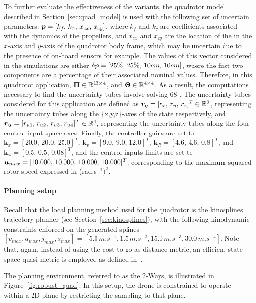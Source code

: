 To further evaluate the effectiveness of the  variants, the quadrotor model described in Section~\ref{sec:quad_model} is used with the following set of uncertain parameters: $\boldsymbol{p} = [k_{f}, \, k_{\tau}, \, x_{cx}, \, x_{cy}]$, where $k_{f}$ and $k_{\tau}$ are coefficients associated with the dynamics of the propellers, and $x_{cx}$ and $x_{cy}$ are the location of the  in the $x$-axis and $y$-axis of the quadrotor body frame, which may be uncertain due to the presence of on-board sensors for example.
The values of this vector considered in the simulations are either $\delta\boldsymbol{p} = [25\%, \, 25\%, \, 10cm, \, 10cm]$, where the first two components are a percentage of their associated nominal values. 
Therefore, in this quadrotor application, $\boldsymbol{\Pi} \in \mathbb{R}^{13\times4}$, and $\boldsymbol{\Theta} \in \mathbb{R}^{4\times4}$.
As a result, the computations necessary to find the uncertainty tubes involve solving 68 .
The uncertainty tubes considered for this application are defined as $\boldsymbol{r_q} = [r_x, \, r_y, \, r_z]^T \in \mathbb{R}^3$, representing the uncertainty tubes along the \{x,y,z\}-axes of the state respectively, and $\boldsymbol{r_u} = [r_{u1}, \, r_{u2}, \, r_{u3}, \, r_{u4}]^T \in \mathbb{R}^4$, representing the uncertainty tubes along the four control input space axes.
Finally, the controller gains are set to $\boldsymbol{k}_{x} = [20.0, \, 20.0, \, 25.0]^T$, $\boldsymbol{k}_{v}= [9.0, \, 9.0, \, 12.0]^T$, $\boldsymbol{k}_{R}=[4.6, \, 4.6, \, 0.8]^T$, and $\boldsymbol{k}_{\omega}=[0.5, \, 0.5, \, 0.08]^T$, and the control inputs limits are set to $\boldsymbol{u}_{max} = [10.000, \, 10.000, \, 10.000, \, 10.000]^T$, corresponding to the maximum squared rotor speed expressed in (rad.s$^{-1})^2$.

\paragraph{Planning setup}

Recall that the local planning method used for the quadrotor is the kinosplines trajectory planner (see Section~\ref{sec:kinosplines}), with the following kinodynamic constraints enforced on the generated splines $[v_{max}, a_{max}, j_{max}, s_{max}] = [5.0 \, m.s^{-1}, \allowbreak 1.5 \, m.s^{-2}, \allowbreak 15.0 \, m.s^{-3}, \allowbreak 30.0 \, m.s^{-4}]$. 
Note that, again, instead of using the cost-to-go as distance metric, an efficient state-space quasi-metric is employed as defined in~\cite{cKino}.

The planning environment, referred to as the 2-Ways, is illustrated in Figure~\ref{fig:robust_quad}. 
In this setup, the drone is constrained to operate within a 2D plane by restricting the sampling to that plane.

